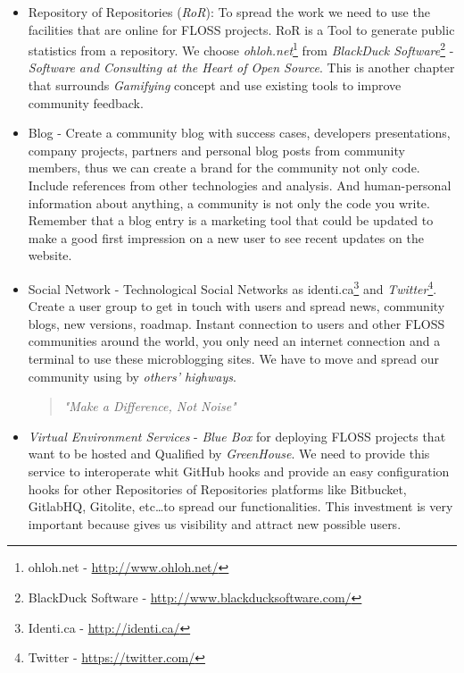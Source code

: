 \documentclass[11pt]{scrartcl}
\begin{document}
\begin{itemize}
	\item Repository of Repositories (\emph{RoR}): To spread the work we need to use the facilities that are online for FLOSS projects. RoR is a Tool to generate public statistics from a repository. We choose \emph{ohloh.net}\footnote{ohloh.net - \url{http://www.ohloh.net/}} from \emph{BlackDuck Software}\footnote{BlackDuck Software - \url{http://www.blackducksoftware.com/}} - \emph{Software and Consulting at the Heart of Open Source}. This is another chapter that surrounds \emph{Gamifying} concept and use existing tools to improve community feedback.
	 \item Blog - Create a community blog with success cases, developers presentations, company projects, partners and personal blog posts from community members, thus we can create a brand for the community not only code. Include references from other technologies and analysis. And human-personal information about anything, a community is not only the code you write. Remember that a blog entry is a marketing tool that could be updated to make a good first impression on a new user to see recent updates on the website.
	 \item Social Network - Technological Social Networks as identi.ca\footnote{Identi.ca - \url{http://identi.ca/}} and \emph{Twitter}\footnote{Twitter - \url{https://twitter.com/}}. Create a user group to get in touch with users and spread news, community blogs, new versions, roadmap. Instant connection to users and other FLOSS communities around the world, you only need an internet connection and a terminal to use these microblogging sites. We have to move and spread our community using by \emph{others' highways}.
	 \begin{quotation}
	    \begin{center}
	    \emph{"Make a Difference, Not Noise"}
	    \end{center}
	 \end{quotation}
    \item \emph{Virtual Environment Services} - \emph{Blue Box} for deploying FLOSS projects that want to be hosted and Qualified by \emph{GreenHouse}. We need to provide this service to interoperate whit GitHub hooks and provide an easy configuration hooks for other Repositories of Repositories platforms like Bitbucket, GitlabHQ, Gitolite, etc\ldots to spread our functionalities. This investment is very important because gives us visibility and attract new possible users.
\end{itemize}
\end{document}
